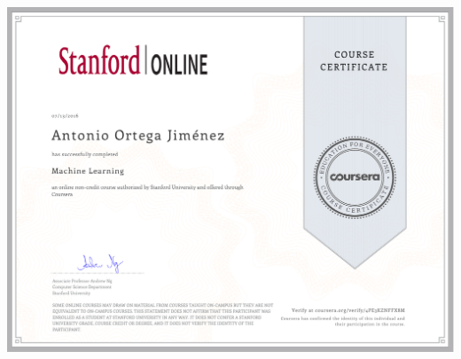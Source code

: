 \hypertarget{ML-Coursera}{}
\begin{landscape}
\centering
\includegraphics[width=\textwidth]{ML-Coursera.pdf}
\end{landscape}
\restoregeometry
\clearpage


\hypertarget{exp-en}{}

\clearpage


\hypertarget{cae}{}

\clearpage



